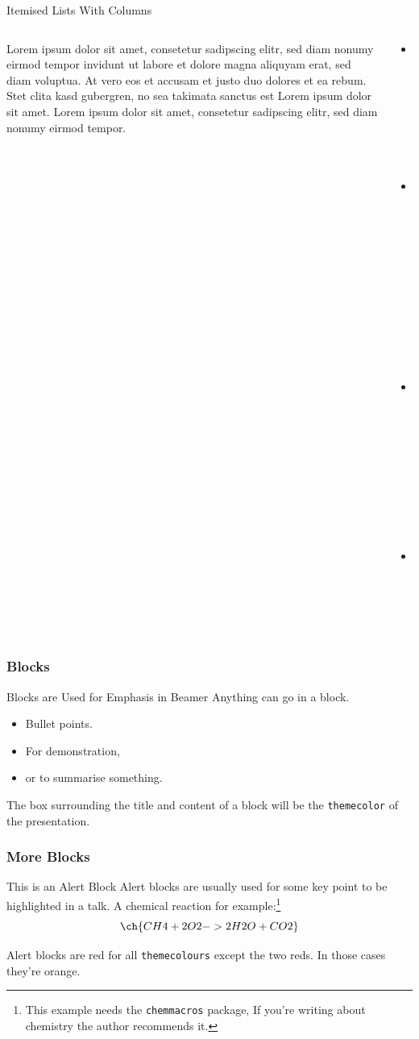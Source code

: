 \documentclass[aspectratio=169]{beamer}
\begin{document}
\begin{frame}{Itemised Lists With Columns}
\begin{columns}[T]
\begin{column}{0.48\textwidth}
Lorem ipsum dolor sit amet, consetetur sadipscing elitr, sed diam nonumy eirmod tempor invidunt ut labore et dolore magna aliquyam erat, sed diam voluptua. At vero eos et accusam et justo duo dolores et ea rebum. Stet clita kasd gubergren, no sea takimata sanctus est Lorem ipsum dolor sit amet. Lorem ipsum dolor sit amet, consetetur sadipscing elitr, sed diam nonumy eirmod tempor.
\end{column}
\begin{column}{0.48\textwidth}
\begin{itemize}
   \item One point
   \item Another point
   \item And a \alert{third}!
   \item \textit{Four}?
\end{itemize}
\end{column}
\end{columns}
\end{frame}


\begin{frame}
\frametitle{Blocks}
\begin{block}{Blocks are Used for Emphasis in Beamer}
Anything can go in a block.
\begin{itemize}
   \item Bullet points.
   \item For demonstration,
   \item or to summarise something.
\end{itemize}
The box surrounding the title and content of a block will be the \texttt{themecolor} of the presentation.
\end{block}
\end{frame}


\begin{frame}
\frametitle{More Blocks}
\begin{alertblock}{This is an Alert Block}
Alert blocks are usually used for some key point to be highlighted in a talk.
A chemical reaction for example:\footnote{This example needs the \texttt{chemmacros} package, If you're writing about chemistry the author recommends it.}
\begin{equation}
   \ch{CH4 + 2 O2 -> 2 H2O + CO2}
\end{equation}

Alert blocks are red for all \texttt{themecolours} except the two reds. In those cases they're orange.
\end{alertblock}
\end{frame}
\end{document}
